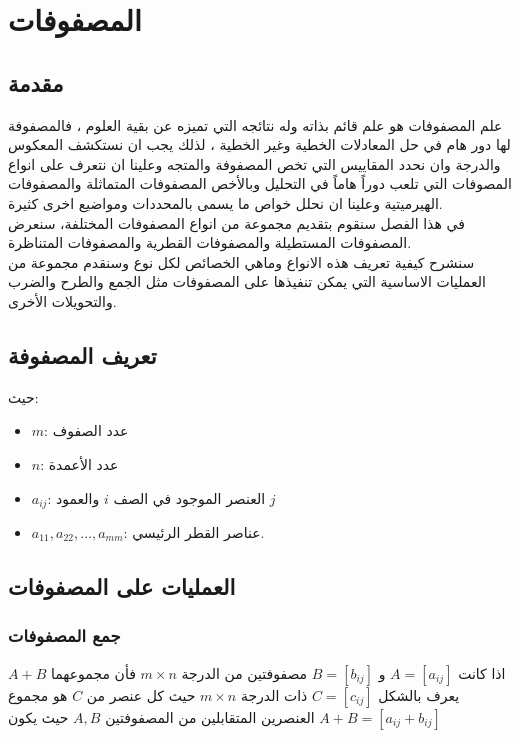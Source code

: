 

	{
	\vspace*{5cm}
	\chapter{المصفوفات}
	\vfill
	\newpage
	}
	
	\section*{مقدمة}
	علم المصفوفات هو علم قائم بذاته وله نتائجه التي تميزه عن بقية العلوم ، فالمصفوفة لها دور هام في حل المعادلات الخطية وغير الخطية ، لذلك يجب ان نستكشف المعكوس والدرجة وان نحدد المقاييس التي تخص المصفوفة والمتجه وعلينا ان نتعرف على انواع المصوفات التي تلعب دوراً هاماً في التحليل وبالأخص المصفوفات المتماثلة والمصفوفات الهيرميتية وعلينا ان نحلل خواص ما يسمى بالمحددات ومواضيع اخرى كثيرة.\\
	في هذا الفصل سنقوم بتقديم مجموعة من انواع المصفوفات المختلفة، سنعرض المصفوفات المستطيلة والمصفوفات القطرية والمصفوفات المتناظرة.\\
	سنشرح كيفية تعريف هذه الانواع وماهي الخصائص لكل نوع وسنقدم مجموعة من العمليات الاساسية التي يمكن تنفيذها على المصفوفات مثل الجمع والطرح والضرب والتحويلات الأخرى.
	
	\section{تعريف المصفوفة}
	حيث:
	\begin{itemize}[nosep]
		\item $m$: عدد الصفوف
		\item $n$: عدد الأعمدة
		\item $a_{ij}$: العنصر الموجود في الصف $i$ والعمود $j$
		\item $a_{11}, a_{22}, \dots, a_{mm}$: عناصر القطر الرئيسي.
	\end{itemize}
	
	\section{العمليات على المصفوفات}
	\subsection{جمع المصفوفات}
	اذا كانت $A=[a_{ij}]$ و $B=[b_{ij}]$ مصفوفتين من الدرجة 
	$m\times n$ فأن مجموعهما $A+B$ يعرف بالشكل $C=[c_{ij}]$ ذات الدرجة $m\times n$ حيث كل عنصر من $C$ هو مجموع العنصرين المتقابلين من المصفوفتين $A, B$ حيث يكون $A+B=[a_{ij} + b_{ij}]$
	

